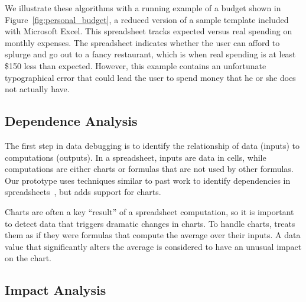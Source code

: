 We illustrate these algorithms with a running
example of a budget shown in Figure~\ref{fig:personal_budget}, 
a reduced version of a sample template included with Microsoft Excel. This
spreadsheet tracks expected versus real spending on monthly
expenses. The spreadsheet indicates whether the user can afford to
splurge and go out to a fancy restaurant, which is when real spending
is at least \$150 less than expected. However, this example contains
an unfortunate typographical error that could lead the user to spend
money that he or she does not actually have.


\subsection{Dependence Analysis}

The first step in data debugging is to identify the relationship of
data (inputs) to computations (outputs).
In a spreadsheet, inputs are data in cells, while computations are
either charts or formulas that are not used by other formulas.
Our \checkcell{} prototype uses techniques similar to past work to identify
dependencies in spreadsheets~\cite{fisher2006scaling}, but adds
support for charts.

Charts are often a key ``result'' of a spreadsheet computation, so it
is important to detect data that triggers dramatic changes in
charts. To handle charts, \checkcell{} treats them as if they were
formulas that compute the average over their inputs. A data value that
significantly alters the average is considered to have an
unusual impact on the chart.




\subsection{Impact Analysis}


